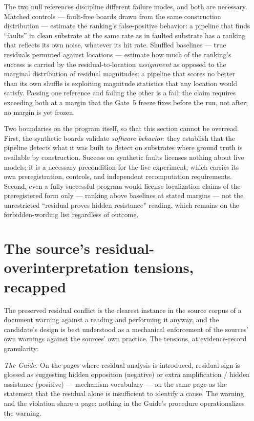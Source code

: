 The two null references discipline different failure modes, and both
are necessary. Matched controls --- fault-free boards drawn from the
same construction distribution --- estimate the ranking's false-positive
behavior: a pipeline that finds ``faults'' in clean substrate at the
same rate as in faulted substrate has a ranking that reflects its own
noise, whatever its hit rate. Shuffled baselines --- true residuals
permuted against locations --- estimate how much of the ranking's
success is carried by the residual-to-location \emph{assignment} as
opposed to the marginal distribution of residual magnitudes: a
pipeline that scores no better than its own shuffle is exploiting
magnitude statistics that any location would satisfy. Passing one
reference and failing the other is a fail; the claim
requires exceeding both at a margin that the Gate~5 freeze fixes
before the run, not after; no margin is yet frozen.

Two boundaries on the program itself, so that this section cannot be
overread. First, the synthetic boards validate \emph{software behavior}:
they establish that the pipeline detects what it was built to detect on
substrates where ground truth is available by construction. Success on
synthetic faults licenses nothing about live models; it is a necessary
precondition for the live experiment, which carries its own
preregistration, controls, and independent recomputation requirements.
Second, even a fully successful program would license localization
claims of the preregistered form only --- ranking above baselines at
stated margins --- not the unrestricted ``residual proves hidden
resistance'' reading, which remains on the forbidden-wording list
regardless of outcome.

\section{The source's residual-overinterpretation tensions, recapped}\label{ch10:sec:tensions}

The preserved residual conflict is the clearest instance in the source
corpus of a document warning against a reading and performing it
anyway, and the candidate's design is best understood as a mechanical
enforcement of the sources' own warnings against the sources' own
practice. The tensions, at evidence-record granularity:

\emph{The Guide.} On the pages where residual analysis is introduced,
residual sign is glossed as suggesting hidden opposition (negative) or
extra amplification / hidden assistance (positive) --- mechanism
vocabulary --- on the same page as the statement that the residual alone
is insufficient to identify a cause. The warning and the violation
share a page; nothing in the Guide's procedure operationalizes the
warning.

